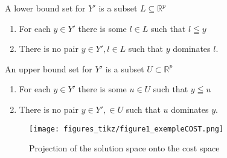 \begin{definition}
A lower bound set for $Y'$ is a subset $L \subseteq \mathbb{R}^p$
\begin{enumerate}
    \item For each $y\in Y'$ there is some $l\in L$ such that $l\leqq y$
    \item There is no pair $y\in Y',l\in L$ such that $y$ dominates $l$.
\end{enumerate}
\end{definition}
\begin{definition}
An upper bound set for $Y'$ is a subset $U \subset \mathbb{R}^p$
\begin{enumerate}
    \item For each $y\in Y'$ there is some $u\in U$ such that $y\leqq u$
    \item There is no pair $y\in Y',\in U$ such that $u$ dominates $y$.
\end{enumerate}
\end{definition}
%

\begin{figure}
    \centering
    \texttt{[image: figures\_tikz/figure1\_exempleCOST.png]}
    \caption{Projection of the solution space onto the cost space}
    \label{fi:costspace}
\end{figure}